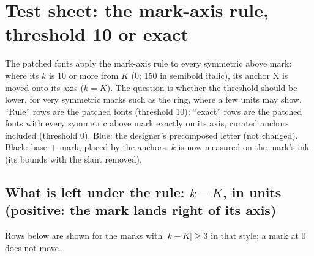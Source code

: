 \documentclass[10pt]{article}
\begin{document}
\section*{Test sheet: the mark-axis rule, threshold 10 or exact}
The patched fonts apply the mark-axis rule to every symmetric above mark: where its $k$ is 10 or more from $K$ (0; 150 in semibold italic), its anchor X is moved onto its axis ($k = K$).
The question is whether the threshold should be lower, for very symmetric marks such as the ring, where a few units may show.
``Rule'' rows are the patched fonts (threshold 10); ``exact'' rows are the patched fonts with every symmetric above mark exactly on its axis, curated anchors included (threshold 0).
{\color{precomposed}Blue}: the designer's precomposed letter (not changed). Black: base + mark, placed by the anchors.
$k$ is now measured on the mark's ink (its bounds with the slant removed).

\subsection*{What is left under the rule: $k - K$, in units (positive: the mark lands right of its axis)}
Rows below are shown for the marks with $|k - K| \ge 3$ in that style; a mark at 0 does not move.
\end{document}
